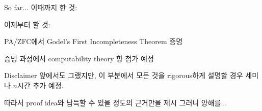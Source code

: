 \documentclass[../231120_msquare_computational-logic.tex]{subfiles}
\begin{document}
\begin{frame}{So far...}
    이때까지 한 것:
    \begin{center}
    \end{center}
    \pause
    \begin{alertblock}{}
        이제부터 할 것:
        \begin{itemize}
            \ii PA/ZFC에서 Godel's First Incompleteness Theorem 증명
                \begin{itemize}
                    \ii 증명 과정에서 computability theory 향 첨가 예정
                \end{itemize}
        \end{itemize}
    \end{alertblock}
    \pause

    \begin{alertblock}{Disclaimer}
        \small
        앞에서도 그랬지만, 이 부분에서 모든 것을 rigorous하게
        설명할 경우 세미나 \(n\)시간 추가 예정.
        \begin{itemize}
            \ii 따라서 proof idea와 납득할 수 있을 정도의 근거만을 제시
            \ii 그러니 양해를...
        \end{itemize}
    \end{alertblock}
\end{frame}
\end{document}
